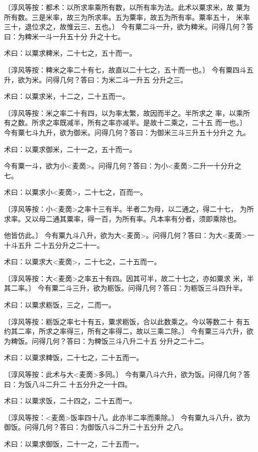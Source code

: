 \documentclass[12pt,UTF8]{ctexbook}
\begin{document}
〔淳风等按：都术：以所求率乘所有数，以所有率为法。此术以粟求米，故 粟为所有数。三是米率，故三为所求率。五为粟率，故五为所有率。粟率五十， 米率三十，退位求之，故惟云三、五也。〕 今有粟二斗一升，欲为粺米。问得几何？答曰：为粺米一斗一升五十分 升之十七。

术曰：以粟求粺米，二十七之，五十而一。

〔淳风等按：粺米之率二十有七，故直以二十七之，五十而一也。〕 今有粟四斗五升，欲为米。问得几何？答曰：为米二斗一升五 分升之三。

术曰：以粟求米，十二之，二十五而一。

〔淳风等按：米之率二十有四，以为率太繁，故因而半之。半所求之 率，以乘所有之数。所求之率既减半，所有之率亦减半。是故十二乘之，二十五 而一也。〕 今有粟七斗九升，欲为御米。问得几何？答曰：为御米三斗三升五十分升之 九。

术曰：以粟求御米，二十一之，五十而一。

今有粟一斗，欲为小<麦啇>。问得几何？答曰：为小<麦啇>二升一十分升之 七。

术曰：以粟求小<麦啇>，二十七之，百而一。

〔淳风等按：小<麦啇>之率十三有半。半者二为母，以二通之，得二十七， 为所求率。又以母二通其粟率，得一百，为所有率。凡本率有分者，须即乘除也。

他皆仿此。〕 今有粟九斗八升，欲为大<麦啇>。问得几何？答曰：为大<麦啇>一十斗五升 二十五分升之二十一。

术曰：以粟求大<麦啇>，二十七之，二十五而一。

〔淳风等按：大<麦啇>之率五十有四。因其可半，故二十七之，亦如粟求 米，半其二率。〕 今有粟二斗三升，欲为粝饭。问得几何？答曰：为粝饭三斗四升半。

术曰：以粟求粝饭，三之，二而一。

〔淳风等按：粝饭之率七十有五，粟求粝饭，合以此数乘之。今以等数二十 有五约其二率，所求之率得三，所有之率得二，故以三乘二除。〕 今有粟三斗六升，欲为粺饭。问得几何？答曰：为粺饭三斗八升二十五 分升之二十二。

术曰：以粟求粺饭，二十七之，二十五而一。

〔淳风等按：此术与大<麦啇>多同。〕 今有粟八斗六升，欲为饭。问得几何？答曰：为饭八斗二升二 十五分升之一十四。

术曰：以粟求饭，二十四之，二十五而一。

〔淳风等按：<麦啇>饭率四十八。此亦半二率而乘除。〕 今有粟九斗八升，欲为御饭。问得几何？答曰：为御饭八斗二升二十五分升 之八。

术曰：以粟求御饭，二十一之，二十五而一。
\end{document}

